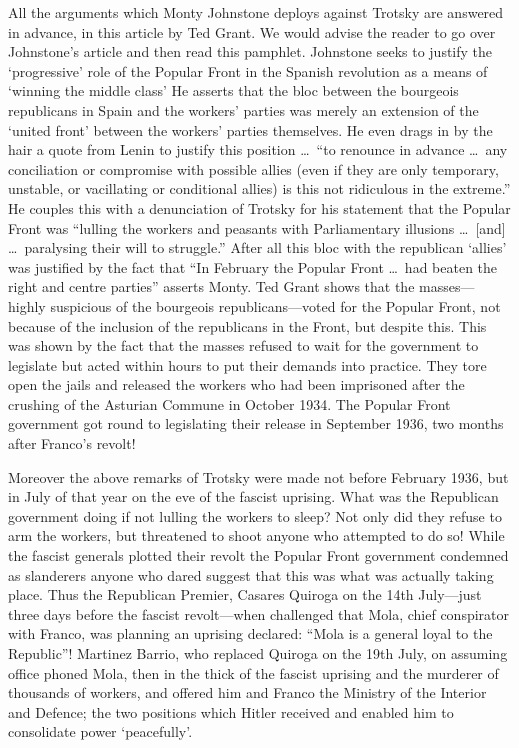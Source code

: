 \documentclass[
  12pt,
  pagesize,
  paper = 6in:9in,
  DIV = 12,
  openany
]{scrbook}
\begin{document}
All the arguments which Monty Johnstone deploys against Trotsky
are answered in advance, in this article by Ted Grant. We would
advise the reader to go over Johnstone’s article and then read this
pamphlet. Johnstone seeks to justify the ‘progressive’ role of the
Popular Front in the Spanish revolution as a means of ‘winning the
middle class’ He asserts that the bloc between the bourgeois
republicans in Spain and the workers’ parties was merely an extension
of the ‘united front’ between the workers’ parties themselves.
He even drags in by the hair a quote from Lenin to justify this position
\dots\ “to renounce in advance \dots\ any conciliation or compromise
with possible allies (even if they are only temporary, unstable, or
vacillating or conditional allies) is this not ridiculous in the extreme.''
He couples this with a denunciation of Trotsky for his statement that
the Popular Front was “lulling the workers and peasants with
Parliamentary illusions \dots\ [and] \dots\ paralysing their will to struggle.''
After all this bloc with the republican ‘allies’ was justified by the
fact that “In February the Popular Front \dots\ had beaten the right
and centre parties'' asserts Monty. Ted Grant shows that the
masses---highly suspicious of the bourgeois republicans---voted for
the Popular Front, not because of the inclusion of the republicans
in the Front, but despite this. This was shown by the fact that the
masses refused to wait for the government to legislate but acted
within hours to put their demands into practice. They tore open the
jails and released the workers who had been imprisoned after the
crushing of the Asturian Commune in October 1934. The Popular
Front government got round to legislating their release in September
1936, two months after Franco’s revolt!

Moreover the above remarks of Trotsky were made not before
February 1936, but in July of that year on the eve of the fascist uprising.
What was the Republican government doing if not lulling the
workers to sleep? Not only did they refuse to arm the workers, but
threatened to shoot anyone who attempted to do so! While the fascist
generals plotted their revolt the Popular Front government condemned
as slanderers anyone who dared suggest that this was what was
actually taking place. Thus the Republican Premier, Casares Quiroga
on the 14th July---just three days before the fascist revolt---when
challenged that Mola, chief conspirator with Franco, was planning
an uprising declared: “Mola is a general loyal to the Republic”! Martinez
Barrio, who replaced Quiroga on the 19th July, on assuming
office phoned Mola, then in the thick of the fascist uprising and the
murderer of thousands of workers, and offered him and Franco the
Ministry of the Interior and Defence; the two positions which Hitler
received and enabled him to consolidate power ‘peacefully’.
\end{document}
